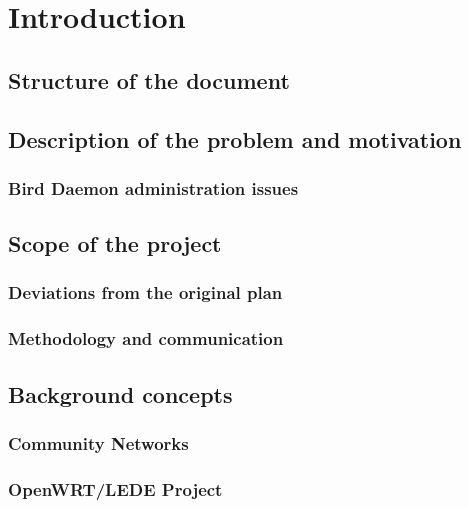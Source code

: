 \chapter{Introduction}
\label{ch:introduction}
\pagestyle{headings}


\cite{nitos}

\section{Structure of the document}



\section{Description of the problem and motivation}
\label{sec:bdotp}


\subsection{Bird Daemon administration issues}
\label{subsec:bdai}

\section{Scope of the project}
\label{sec:sotp}

\subsection{Deviations from the original plan}



\subsection{Methodology and communication}



\section{Background concepts}
\label{sec:backc}

\subsection{Community Networks}
\label{subsec:cn}

\subsection{OpenWRT/LEDE Project}
\label{subsec:owrtlp}


